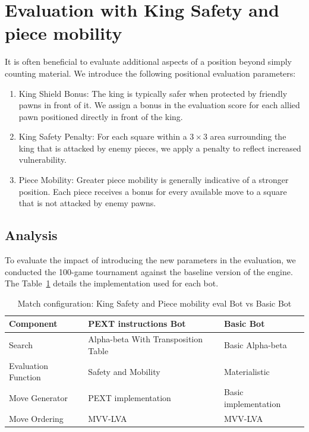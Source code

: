 \section{Evaluation with King Safety and piece mobility}

It is often beneficial to evaluate additional aspects of a position beyond simply counting material. We introduce the following positional evaluation parameters:

\begin{enumerate}
    \item King Shield Bonus: The king is typically safer when protected by friendly pawns in front of it. We assign a bonus in the evaluation score for each allied pawn positioned directly in front of the king.

    \item King Safety Penalty: For each square within a $3 \times 3$ area surrounding the king that is attacked by enemy pieces, we apply a penalty to reflect increased vulnerability.

    \item Piece Mobility: Greater piece mobility is generally indicative of a stronger position. Each piece receives a bonus for every available move to a square that is not attacked by enemy pawns.
\end{enumerate}

\subsection{Analysis}

To evaluate the impact of introducing the new parameters in the evaluation, we conducted the 100-game tournament against the baseline version of the engine. The Table~\ref{tab:safety_mobility_vs_basic} details the implementation used for each bot.

\begin{table}[H]
    \centering
    \begin{tabular}{|p{4cm}|p{4cm}|p{4cm}|}
    \hline
    \textbf{Component}         & \textbf{PEXT instructions Bot}  & \textbf{Basic Bot}     \\ \hline
    Search                     & Alpha-beta With Transposition Table          & Basic Alpha-beta           \\ \hline
    Evaluation Function        & Safety and Mobility                      & Materialistic      \\ \hline
    Move Generator             & PEXT implementation              & Basic implementation   \\ \hline
    Move Ordering              & MVV-LVA                           & MVV-LVA                \\ \hline
    \end{tabular}
    \caption{Match configuration: King Safety and Piece mobility eval Bot vs Basic Bot}
    \label{tab:safety_mobility_vs_basic}
\end{table}

